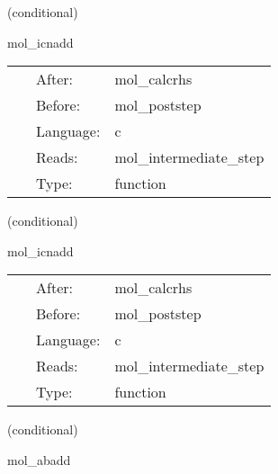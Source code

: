 \vspace{5mm}

   (conditional) 

\hspace{5mm} mol\_icnadd 

\hspace{5mm}{\it updates calculated with the efficient icn method } 


\hspace{5mm}

 \begin{tabular*}{160mm}{cll} 
~ & After:  & mol\_calcrhs \\ 
~ & Before:  & mol\_poststep \\ 
~ & Language:  & c \\ 
~ & Reads:  & mol\_intermediate\_step \\ 
~ & Type:  & function \\ 
\end{tabular*} 


\vspace{5mm}

   (conditional) 

\hspace{5mm} mol\_icnadd 

\hspace{5mm}{\it updates calculated with the averaging icn method } 


\hspace{5mm}

 \begin{tabular*}{160mm}{cll} 
~ & After:  & mol\_calcrhs \\ 
~ & Before:  & mol\_poststep \\ 
~ & Language:  & c \\ 
~ & Reads:  & mol\_intermediate\_step \\ 
~ & Type:  & function \\ 
\end{tabular*} 


\vspace{5mm}

   (conditional) 

\hspace{5mm} mol\_abadd 

\hspace{5mm}{\it updates calculated with the adams-bashforth } 


\hspace{5mm}

